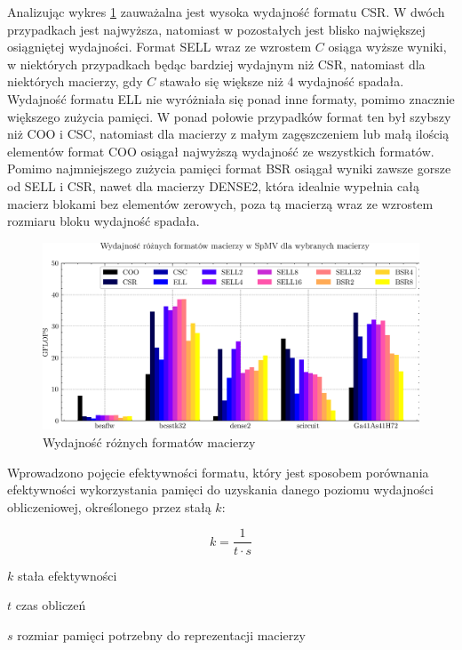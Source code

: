 Analizując wykres \ref{all_plot} zauważalna jest wysoka wydajność formatu CSR. W dwóch przypadkach jest najwyższa, natomiast w pozostałych jest blisko największej osiągniętej wydajności. 
Format SELL wraz ze wzrostem $C$ osiąga wyższe wyniki, w niektórych przypadkach będąc bardziej wydajnym niż CSR, natomiast dla niektórych macierzy, gdy $C$ stawało się większe niż $4$ wydajność spadała.
Wydajność formatu ELL nie wyróżniała się ponad inne formaty, pomimo znacznie większego zużycia pamięci.
W ponad połowie przypadków format ten był szybszy niż COO i CSC, natomiast dla macierzy z małym zagęszczeniem lub małą ilością elementów format COO osiągał najwyższą wydajność ze wszystkich formatów.
Pomimo najmniejszego zużycia pamięci format BSR osiągał wyniki zawsze gorsze od SELL i CSR, nawet dla macierzy DENSE2, która idealnie wypełnia całą macierz blokami bez elementów zerowych, poza tą macierzą wraz ze wzrostem rozmiaru bloku wydajność spadała.

\begin{figure}[!htb]
    \centering
    \includegraphics[width=\linewidth]{result_plots/barchart.png}
    \caption{Wydajność różnych formatów macierzy}\label{all_plot}
\end{figure}

Wprowadzono pojęcie efektywności formatu, który jest sposobem porównania efektywności wykorzystania pamięci do uzyskania danego poziomu wydajności obliczeniowej, określonego przez stałą $k$:

\begin{equation}
    k = \frac{1}{t \cdot s}
\end{equation}

\begin{eqwhere}[2cm]
	\item[$k$] stała efektywności
	\item[$t$] czas obliczeń
    \item[$s$] rozmiar pamięci potrzebny do reprezentacji macierzy
\end{eqwhere}

